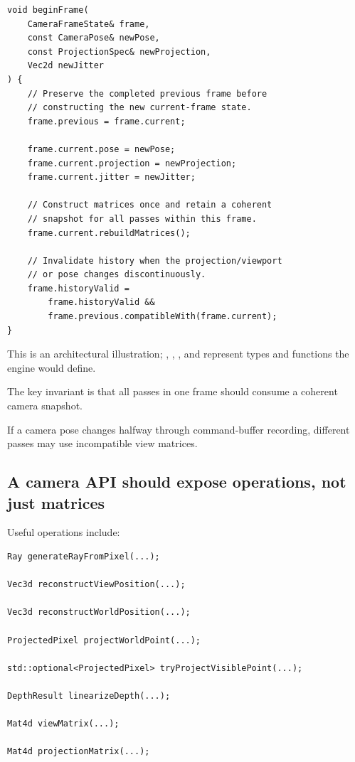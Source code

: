 \begin{verbatim}
void beginFrame(
    CameraFrameState& frame,
    const CameraPose& newPose,
    const ProjectionSpec& newProjection,
    Vec2d newJitter
) {
    // Preserve the completed previous frame before
    // constructing the new current-frame state.
    frame.previous = frame.current;

    frame.current.pose = newPose;
    frame.current.projection = newProjection;
    frame.current.jitter = newJitter;

    // Construct matrices once and retain a coherent
    // snapshot for all passes within this frame.
    frame.current.rebuildMatrices();

    // Invalidate history when the projection/viewport
    // or pose changes discontinuously.
    frame.historyValid =
        frame.historyValid &&
        frame.previous.compatibleWith(frame.current);
}
\end{verbatim}

This is an architectural illustration; , , , and  represent types and functions the engine would define.

The key invariant is that all passes in one frame should consume a coherent camera snapshot.

If a camera pose changes halfway through command-buffer recording, different passes may use incompatible view matrices.

\subsection{A camera API should expose operations, not just matrices}\label{02-foundations-ii-ch037-a-camera-api-should-expose-operations-not-just-matrices}

\hypertarget{02-foundations-ii-ch037-a-camera-api-should-expose-operations-not-just-matrices}{}

Useful operations include:

\begin{verbatim}
Ray generateRayFromPixel(...);

Vec3d reconstructViewPosition(...);

Vec3d reconstructWorldPosition(...);

ProjectedPixel projectWorldPoint(...);

std::optional<ProjectedPixel> tryProjectVisiblePoint(...);

DepthResult linearizeDepth(...);

Mat4d viewMatrix(...);

Mat4d projectionMatrix(...);
\end{verbatim}

